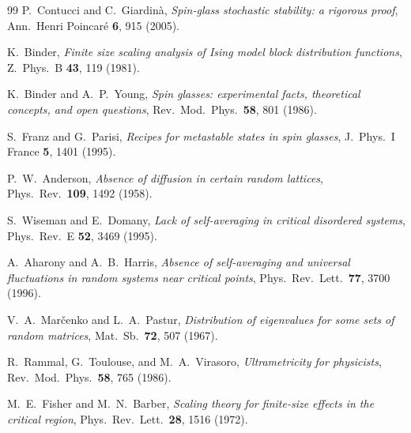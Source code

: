 \documentclass[11pt,a4paper]{article}
\begin{document}
\begin{thebibliography}{99}
P.~Contucci and C.~Giardin\`a,
\emph{Spin-glass stochastic stability: a rigorous proof},
Ann.\ Henri Poincar\'e \textbf{6}, 915 (2005).

K.~Binder,
\emph{Finite size scaling analysis of Ising model
block distribution functions},
Z.\ Phys.\ B \textbf{43}, 119 (1981).

K.~Binder and A.~P.~Young,
\emph{Spin glasses: experimental facts, theoretical concepts,
and open questions},
Rev.\ Mod.\ Phys.\ \textbf{58}, 801 (1986).

S.~Franz and G.~Parisi,
\emph{Recipes for metastable states in spin glasses},
J.\ Phys.\ I France \textbf{5}, 1401 (1995).

P.~W.~Anderson,
\emph{Absence of diffusion in certain random lattices},
Phys.\ Rev.\ \textbf{109}, 1492 (1958).

S.~Wiseman and E.~Domany,
\emph{Lack of self-averaging in critical disordered systems},
Phys.\ Rev.\ E \textbf{52}, 3469 (1995).

A.~Aharony and A.~B.~Harris,
\emph{Absence of self-averaging and universal fluctuations
in random systems near critical points},
Phys.\ Rev.\ Lett.\ \textbf{77}, 3700 (1996).

V.~A.~Mar\v{c}enko and L.~A.~Pastur,
\emph{Distribution of eigenvalues for some sets of random matrices},
Mat.\ Sb.\ \textbf{72}, 507 (1967).

R.~Rammal, G.~Toulouse, and M.~A.~Virasoro,
\emph{Ultrametricity for physicists},
Rev.\ Mod.\ Phys.\ \textbf{58}, 765 (1986).

M.~E.~Fisher and M.~N.~Barber,
\emph{Scaling theory for finite-size effects in the critical region},
Phys.\ Rev.\ Lett.\ \textbf{28}, 1516 (1972).

\end{thebibliography}
\end{document}
